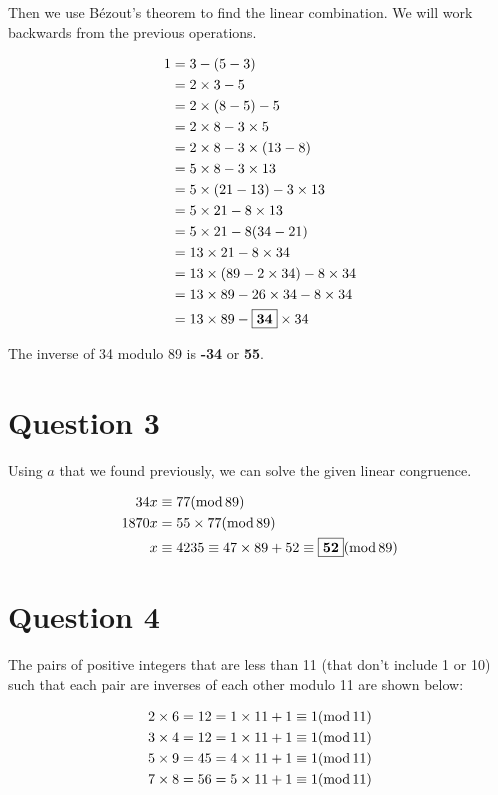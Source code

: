 \documentclass[11pt]{article}
\begin{document}
Then we use B\'{e}zout's theorem to find the linear combination. We will work backwards from the previous operations.

\begin{align*}
    1 &= 3 - (5 - 3)\\
    &= 2 \times 3 - 5\\
    &= 2 \times (8 - 5) - 5\\
    &= 2 \times 8 - 3 \times 5\\
    &= 2 \times 8 - 3 \times (13 - 8)\\
    &= 5 \times 8 - 3 \times 13\\
    &= 5 \times (21 - 13) - 3 \times 13\\
    &= 5 \times 21 - 8 \times 13\\
    &= 5 \times 21 - 8 (34 - 21)\\
    &= 13 \times 21 - 8 \times 34\\
    &= 13 \times (89 - 2 \times 34) - 8 \times 34\\
    &= 13 \times 89 - 26 \times 34 - 8 \times 34\\
    &= 13 \times 89 - \fbox{\textbf{34}} \times 34
\end{align*}

The inverse of 34 modulo 89 is \textbf{-34} or \textbf{55}.

\section*{Question 3}
Using $a$ that we found previously, we can solve the given linear congruence.

\begin{align*}
    34x &\equiv 77 (\mathinner{\text{mod}} 89)\\
    1870x &= 55 \times 77 (\mathinner{\text{mod}} 89)\\
    x &\equiv 4235 \equiv 47 \times 89 + 52 \equiv \fbox{\textbf{52}} (\mathinner{\text{mod}} 89)
\end{align*}

\section*{Question 4}
The pairs of positive integers that are less than 11 (that don't include 1 or 10) such that each pair are inverses of each other modulo 11 are shown below:

\begin{align*}
    2 \times 6 = 12 = 1\times 11 + 1 \equiv 1 (\mathinner{\text{mod}} 11)\\
    3 \times 4 = 12 = 1 \times 11 + 1 \equiv 1 (\mathinner{\text{mod}} 11)\\
    5 \times 9 = 45 = 4 \times 11 + 1 \equiv 1 (\mathinner{\text{mod}} 11)\\
    7 \times 8 = 56 = 5 \times 11 + 1 \equiv 1 (\mathinner{\text{mod}} 11)\\
\end{align*}
\end{document}
